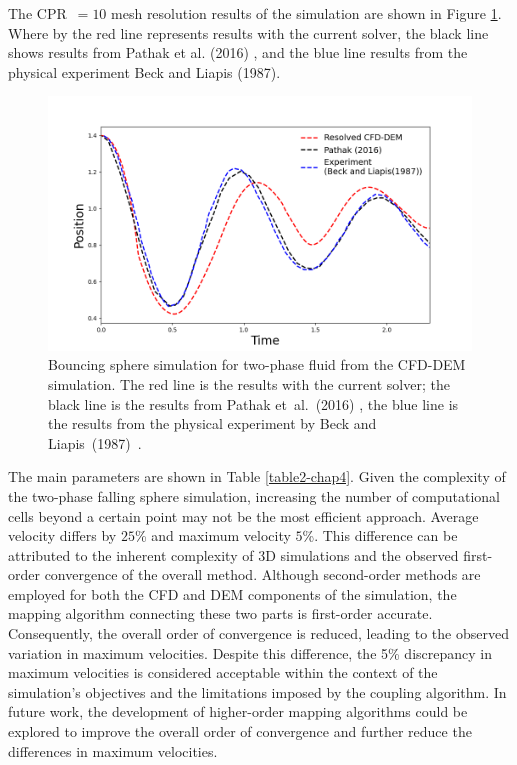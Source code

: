 The CPR~$= 10$ mesh resolution results of the simulation are shown in Figure \ref{fig:2ph_exp}. Where by the red line represents results with the current solver, the black line shows results from Pathak et al. (2016) \cite{pathak20163d}, and the blue line results from the physical experiment Beck and Liapis (1987)\cite{beck1987transient}.
\begin{figure}[!ht]
    \centering
    \includegraphics[width=15cm]{Images/chap3/bouncing_sphere_plot.png}
    \caption{Bouncing sphere simulation for two-phase fluid from the CFD-DEM simulation. The red line is the results with the current solver; the black line is the results from Pathak et~al.~(2016) \cite{pathak20163d}, the blue line is the results from the physical experiment by Beck and Liapis~(1987)~\cite{beck1987transient}.}
    \label{fig:2ph_exp}
    \end{figure}
    
The main parameters are shown in Table \ref{table2-chap4}. Given the complexity of the two-phase falling sphere simulation, increasing the number of computational cells beyond a certain point may not be the most efficient approach. Average velocity differs by $25$\% and maximum velocity $5$\%. This difference can be attributed to the inherent complexity of 3D simulations and the observed first-order convergence of the overall method. Although second-order methods are employed for both the CFD and DEM components of the simulation, the mapping algorithm connecting these two parts is first-order accurate. Consequently, the overall order of convergence is reduced, leading to the observed variation in maximum velocities. Despite this difference, the 5\% discrepancy in maximum velocities is considered acceptable within the context of the simulation's objectives and the limitations imposed by the coupling algorithm. In future work, the development of higher-order mapping algorithms could be explored to improve the overall order of convergence and further reduce the differences in maximum velocities. 

